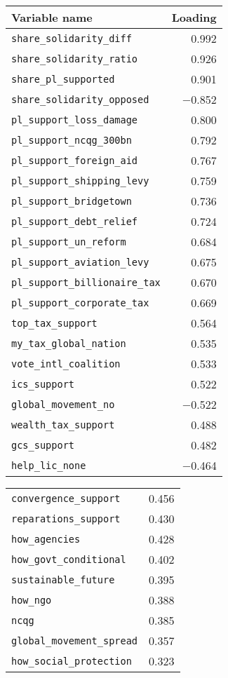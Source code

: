 
\begin{tabular}{lr}
\toprule
Variable name & Loading\\
\midrule
\verb|share_solidarity_diff| & 0.992\\
\verb|share_solidarity_ratio| & 0.926\\
\verb|share_pl_supported| & 0.901\\
\verb|share_solidarity_opposed| & $-$0.852\\
\verb|pl_support_loss_damage| & 0.800\\
\verb|pl_support_ncqg_300bn| & 0.792\\
\verb|pl_support_foreign_aid| & 0.767\\
\verb|pl_support_shipping_levy| & 0.759\\
\verb|pl_support_bridgetown| & 0.736\\
\verb|pl_support_debt_relief| & 0.724\\
\verb|pl_support_un_reform| & 0.684\\
\verb|pl_support_aviation_levy| & 0.675\\
\verb|pl_support_billionaire_tax| & 0.670\\
\verb|pl_support_corporate_tax| & 0.669\\
\verb|top_tax_support| & 0.564\\
\verb|my_tax_global_nation| & 0.535\\
\verb|vote_intl_coalition| & 0.533\\
\verb|ics_support| & 0.522\\
\verb|global_movement_no| & $-$0.522\\
\verb|wealth_tax_support| & 0.488\\
\verb|gcs_support| & 0.482\\
\verb|help_lic_none| & $-$0.464\\
\bottomrule \end{tabular} \switchcolumn \begin{tabular}[h]{lr} \verb|convergence_support| & 0.456\\
\verb|reparations_support| & 0.430\\
\verb|how_agencies| & 0.428\\
\verb|how_govt_conditional| & 0.402\\
\verb|sustainable_future| & 0.395\\
\verb|how_ngo| & 0.388\\
\verb|ncqg| & 0.385\\
\verb|global_movement_spread| & 0.357\\
\verb|how_social_protection| & 0.323\\

\end{tabular}

